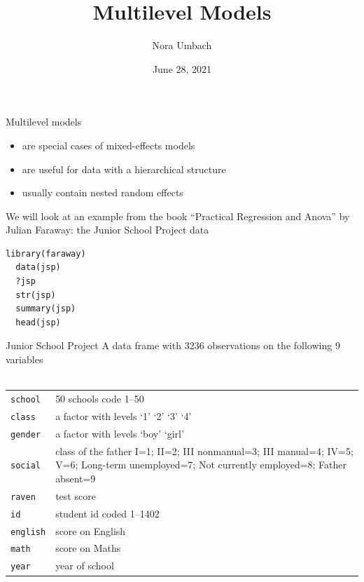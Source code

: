 \documentclass{beamer}
\title{Multilevel Models}
\author{Nora Umbach%
}
\date{June 28, 2021}
\begin{document}
\begin{frame}{}
\thispagestyle{empty}
\titlepage
\end{frame}


\begin{frame}[fragile]{Multilevel models}
  \begin{itemize}
    \item are special cases of mixed-effects models
    \item are useful for data with a hierarchical structure
    \item usually contain nested random effects
  \end{itemize}
  \vspace{1cm}
  We will look at an example from the book ``Practical Regression and
  Anova'' by Julian Faraway: the Junior School Project data
  \begin{lstlisting}[style=plain]
  library(faraway)
  data(jsp)
  ?jsp
  str(jsp)
  summary(jsp)
  head(jsp)
  \end{lstlisting}
\end{frame}

\begin{frame}{Junior School Project}
  A data frame with 3236 observations on the following 9 variables\\~\\

  \begin{tabular}{lp{8cm}}
    \hline
     \texttt{school} & 50 schools code 1--50 \\
     \texttt{class} & a factor with levels `1' `2' `3' `4' \\
     \texttt{gender} & a factor with levels `boy' `girl' \\
     \texttt{social} & class of the father I=1; II=2; III nonmanual=3; III
          manual=4; IV=5; V=6; Long-term unemployed=7; Not currently
          employed=8; Father absent=9 \\
     \texttt{raven} & test score \\
     \texttt{id} & student id coded 1--1402 \\
     \texttt{english} & score on English \\
     \texttt{math} & score on Maths \\
     \texttt{year} & year of school \\
     \hline
  \end{tabular}
  
\end{frame}
\end{document}
